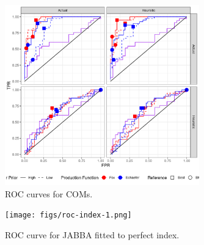 \begin{figure}[ht!]
\centering
\includegraphics[width=0.75\textwidth]{figs/roc-1.png}
\caption{ROC curves for COMs.}
\label{fig:roc}
\end{figure}


\begin{figure}[ht!]
\centering
\texttt{[image: figs/roc-index-1.png]}
\caption{ROC curve for JABBA fitted to perfect index.}
\label{fig:roc-index}
\end{figure}


